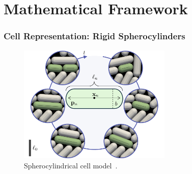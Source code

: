\documentclass[10pt,t]{beamer}
\begin{document}

\section{Mathematical Framework}


\begin{frame}
    \frametitle{Cell Representation: Rigid Spherocylinders}

    \begin{figure}
        \centering
        \includegraphics[width=0.65\textwidth]{figures/cell_model_weady.png}
        \caption*{\scriptsize{Spherocylindrical cell model~\cite{Weady2024}.}}
    \end{figure}

\end{frame}
\end{document}
